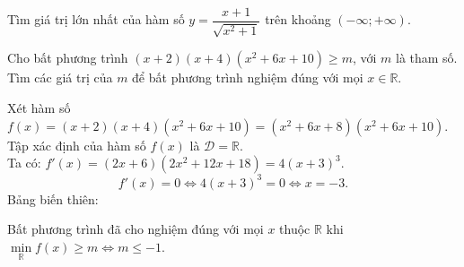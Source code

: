 \begin{vd}%
	Tìm giá trị lớn nhất của hàm số $y=\dfrac{x+1}{\sqrt{x^2+1}}$ trên khoảng $\left( {-\infty;+\infty} \right)$.
\end{vd}


\begin{vd}%
	Cho bất phương trình $(x+2)(x+4)(x^2+6x+10) \geq m$, với $m$ là tham số. Tìm các giá trị của $m$ để bất phương trình nghiệm đúng với mọi $x \in \mathbb{R}$.
	\loigiai
	{
		Xét hàm số $f(x) = (x+2)(x+4)(x^2+6x+10) = (x^2+6x+8)(x^2+6x+10)$.\\
		Tập xác định của hàm số $f(x)$ là $\mathscr{D} = \mathbb{R}$.\\
		Ta có: $f'(x) = (2x+6)(2x^2+12x+18)=4(x+3)^3$.
		$$f'(x) = 0 \Leftrightarrow 4(x+3)^3 = 0 \Leftrightarrow x = -3.$$
		Bảng biến thiên:
		\begin{center}
		\end{center}
		Bất phương trình đã cho nghiệm đúng với mọi $x$ thuộc $\mathbb{R}$ khi $\min\limits_{\mathbb{R}} f(x) \geq m \Leftrightarrow m \leq -1$.
	}
\end{vd}


